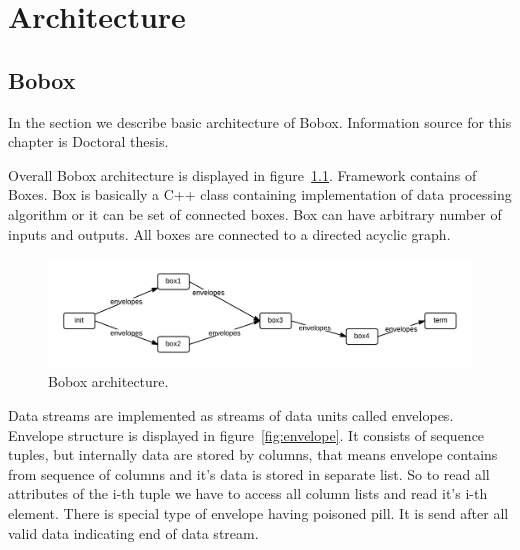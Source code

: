 \chapter{Architecture}

\section{Bobox}

In the section we describe basic architecture of Bobox. Information source for this chapter is Doctoral thesis\cite{faltthesis}. 

Overall Bobox architecture is displayed in figure~\ref{fig:bobox}. Framework contains of Boxes. Box is basically a C++ class containing implementation of data processing algorithm or it can be set of connected boxes. Box can have arbitrary number of inputs and outputs. All boxes are connected to a directed acyclic graph.  

\begin{figure}[h!]
  \centering
    \includegraphics[width=1\textwidth]{bobox}

      \caption{Bobox architecture.}
          \label{fig:bobox}
\end{figure}

Data streams are implemented as streams of data units called envelopes. Envelope structure is displayed in figure~\ref{fig:envelope}. It consists of sequence tuples, but internally data are stored by columns, that means envelope contains from sequence of columns and it's data is stored in separate list. So to read all attributes of the i-th tuple we have to access all column lists and read it's i-th element. There is special type of envelope having poisoned pill. It is send after all valid data indicating end of data stream. 

